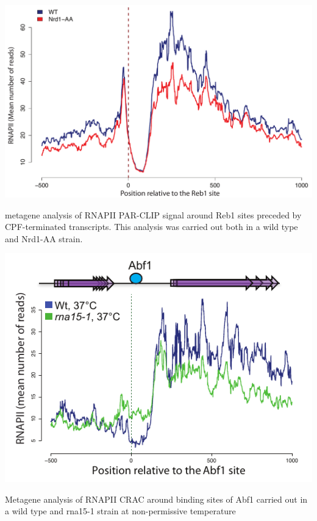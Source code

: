 \begin{suppfigure}[h!]

\centering
\includegraphics[width=\textwidth]{figures/results/rap/S6.pdf}
\caption[]{metagene analysis of RNAPII PAR-CLIP signal around Reb1 sites preceded by CPF-terminated transcripts. This analysis was carried out both in a wild type and Nrd1-AA strain.}
\label{fig:S6}

\end{suppfigure}



\begin{suppfigure}[h!]

\centering
\includegraphics[width=\textwidth]{figures/results/rap/S7.pdf}
\caption[]{Metagene analysis of RNAPII CRAC around binding sites of Abf1 carried out in a wild type and rna15-1 strain at non-permissive temperature}
\label{fig:S7}

\end{suppfigure}



